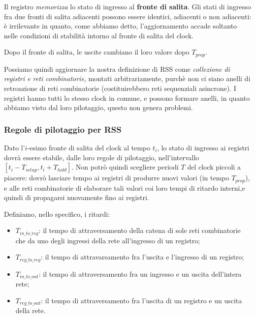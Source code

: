 \documentclass[a4paper,11pt]{article}
\begin{document}
\par\smallskip

Il registro \textit{memorizza} lo stato di ingresso al \textbf{fronte di salita}.
Gli stati di ingresso fra due fronti di salita adiacenti possono essere identici, adiacenti o non adiacenti: è irrilevante in quanto, come abbiamo detto, l'aggiornamento accade soltanto nelle condizioni di stabilità intorno al fronte di salita del clock.

Dopo il fronte di salita, le uscite cambiano il loro valore dopo $T_{prop}$.

\par\medskip

Possiamo quindi aggiornare la nostra definizione di RSS come \textit{collezione di registri e reti combinatorie}, montati arbitrariamente, purchè non ci siano anelli di retroazione di reti combinatorie (costituirebbero reti sequenziali asincrone).
I registri hanno tutti lo stesso clock in comune, e possono formare anelli, in quanto abbiamo visto dal loro pilotaggio, questo non genera problemi.

\subsubsection{Regole di pilotaggio per RSS}
Dato l'$i$-esimo fronte di salita del clock al tempo $t_i$, lo stato di ingresso ai registri dovrà essere stabile, dalle loro regole di pilotaggio, nell'intervallo $[t_i - T_{setup}, t_i + T_{hold}]$.
Non potrò quindi scegliere periodi $T$ del clock piccoli a piacere: dovrò lasciare tempo ai registri di produrre nuovi valori (in tempo $T_{prop}$), e alle reti combinatorie di elaborare tali valori coi loro tempi di ritardo interni,e quindi di propagarsi nuovamente fino ai registri.

Definiamo, nello specifico, i ritardi:
\begin{itemize}
	\item $T_{in\_to\_reg}$: il tempo di attraversamento della catena di sole reti combinatorie che da uno degli ingressi della rete all'ingresso di un registro;
	\item $T_{reg\_to\_reg}$: il tempo di attravarsamento fra l'uscita e l'ingresso di un registro;
	\item $T_{in\_to\_out}$: il tempo di attraversamento fra un ingresso e un uscita dell'intera rete;
	\item $T_{reg\_to\_out}$: il tempo di attraversamento fra l'uscita di un registro e un uscita della rete.
\end{itemize}
\end{document}
